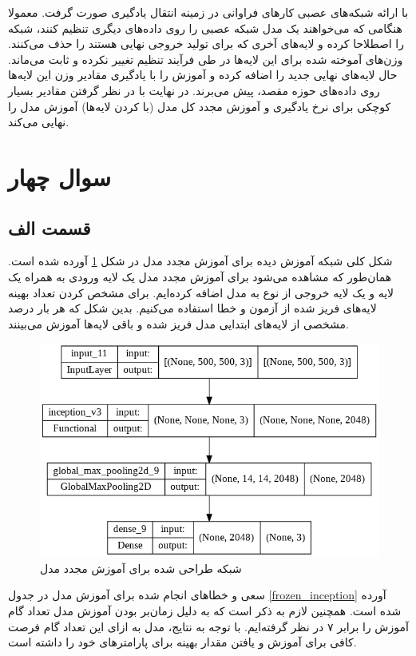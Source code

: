 \documentclass[12pt, a4paper]{article}
\begin{document}
با ارائه شبکه‌های عصبی کار‌های فراوانی در زمینه انتقال یادگیری صورت گرفت. معمولا هنگامی که می‌خواهند یک مدل شبکه عصبی را
روی داده‌های دیگری تنظیم کنند، شبکه را اصطلاحا  کرده و لایه‌های آخری که برای تولید خروجی نهایی هستند را حذف می‌کنند.
وزن‌های آموخته شده برای این لایه‌ها در طی فرآیند تنظیم تغییر نکرده و ثابت می‌ماند. حال لایه‌های
نهایی جدید را اضافه کرده و آموزش را با یادگیری مقادیر وزن این لایه‌ها روی داده‌های حوزه مقصد، پیش می‌برند.
در نهایت با در نظر گرفتن مقادیر بسیار کوچکی برای نرخ یادگیری و آموزش مجدد کل مدل (با کردن لایه‌ها)
آموزش مدل را نهایی می‌کند.

\section*{سوال چهار}

\subsection*{قسمت الف}

شکل کلی شبکه آموزش دیده برای آموزش مجدد مدل  در شکل \ref{inception_pretrain} آورده شده است.
همان‌طور که مشاهده می‌شود برای آموزش مجدد مدل یک لایه ورودی به همراه یک لایه  و یک لایه خروجی از نوع
 به مدل اضافه کرده‌ایم. برای مشخص کردن تعداد بهینه لایه‌های فریز شده از آزمون و خطا استفاده می‌کنیم.
بدین شکل که هر بار درصد مشخصی از لایه‌های ابتدایی مدل  فریز شده و باقی لایه‌ها آموزش می‌بینند.

\begin{figure}[h]
    \centering
    \includegraphics[width=0.8\linewidth]{images/inception.png}
    \caption{شبکه طراحی شده برای آموزش مجدد مدل }
    \label{inception_pretrain}
\end{figure}

سعی و خطاهای انجام شده برای آموزش مدل در جدول \ref{frozen_inception} آورده شده است. همچنین لازم به ذکر است که
به دلیل زمان‌بر بودن آموزش مدل تعداد گام آموزش را برابر ۷ در نظر گرفته‌ایم. با توجه به نتایج، مدل به ازای
این تعداد گام فرصت کافی برای آموزش و یافتن مقدار بهینه برای پارامتر‌های خود را داشته است.
\end{document}
